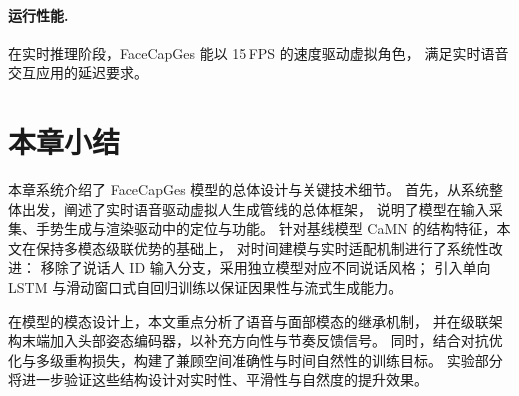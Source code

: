 \paragraph{运行性能.}
在实时推理阶段，FaceCapGes 能以 15\,FPS 的速度驱动虚拟角色，
满足实时语音交互应用的延迟要求。

\section{本章小结}
本章系统介绍了 FaceCapGes 模型的总体设计与关键技术细节。  
首先，从系统整体出发，阐述了实时语音驱动虚拟人生成管线的总体框架，  
说明了模型在输入采集、手势生成与渲染驱动中的定位与功能。
针对基线模型 CaMN 的结构特征，本文在保持多模态级联优势的基础上，  
对时间建模与实时适配机制进行了系统性改进：  
移除了说话人 ID 输入分支，采用独立模型对应不同说话风格；  
引入单向 LSTM 与滑动窗口式自回归训练以保证因果性与流式生成能力。  

在模型的模态设计上，本文重点分析了语音与面部模态的继承机制，  
并在级联架构末端加入头部姿态编码器，以补充方向性与节奏反馈信号。  
同时，结合对抗优化与多级重构损失，构建了兼顾空间准确性与时间自然性的训练目标。  
实验部分将进一步验证这些结构设计对实时性、平滑性与自然度的提升效果。  